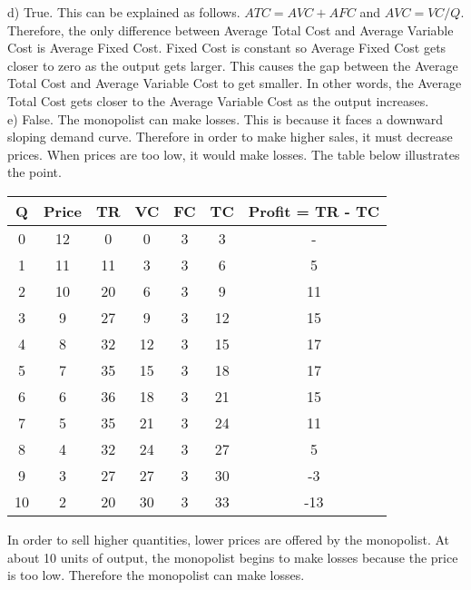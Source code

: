 \documentclass[12pt]{article}
\begin{document}
  d) True. This can be explained as follows. $ATC = AVC + AFC$ and $AVC = VC/Q$. Therefore, the only difference between Average Total Cost and Average Variable Cost is Average Fixed Cost. Fixed Cost is constant so Average Fixed Cost gets closer to zero as the output gets larger. This causes the gap between the Average Total Cost and Average Variable Cost to get smaller. In other words, the Average Total Cost gets closer to the Average Variable Cost as the output increases.\\
  
  e) False. The monopolist can make losses. This is because it faces a downward sloping demand curve. Therefore in order to make higher sales, it must decrease prices. When prices are too low, it would make losses. The table below illustrates the point.
  
  \begin{center}
  	\begin{tabular}{|c|c|c|c|c|c|c|}
  		\hline
  		Q  & Price & TR & VC & FC  & TC & Profit = TR - TC\\
  		\hline
  		0  &  12   &  0 & 0  &  3  &  3 &   -             \\
  		1  &  11   & 11 & 3  &  3  &  6 &   5             \\
  		2  &  10   & 20 & 6  &  3  &  9 &   11            \\
  		3  &  9    & 27 & 9  &  3  & 12 &   15            \\
  		4  &  8    & 32 & 12 &  3  & 15 &   17            \\
  		5  &  7    & 35 & 15 &  3  & 18 &   17            \\
  		6  &  6    & 36 & 18 &  3  & 21 &   15            \\
  		7  &  5    & 35 & 21 &  3  & 24 &   11            \\
  		8  &  4    & 32 & 24 &  3  & 27 &   5             \\
  		9  &  3    & 27 & 27 &  3  & 30 &   -3            \\
  		10 &  2    & 20 & 30 &  3  & 33 &   -13           \\
  		\hline
  	\end{tabular}
  \end{center}
  
  In order to sell higher quantities, lower prices are offered by the monopolist. At about 10 units of output, the monopolist begins to make losses because the price is too low. Therefore the monopolist can make losses.\\
  
\end{document}
